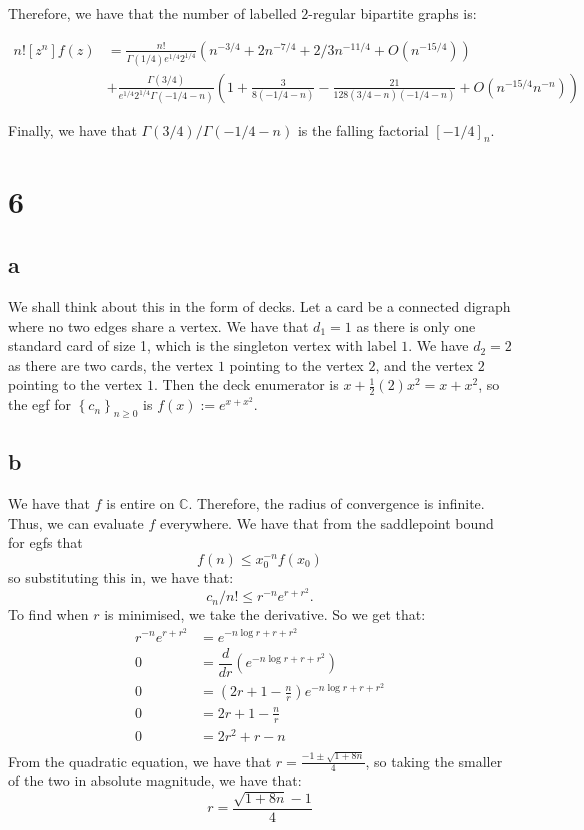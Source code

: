 \documentclass[]{article}
\begin{document}
Therefore, we have that the number of labelled $2$-regular bipartite graphs is:

\begin{align}
	n! [z^n] f(z)&=
\frac{n!}{\Gamma(1/4) e^{1/4} 2^{1/4}}\left( n^{-3/4} +  2 n^{-7/4} + 2/3 n^{-11/4} + O(n^{-15/4}) \right)\\ 
&+
\frac{\Gamma(3/4)}{e^{1/4} 2^{1/4} \Gamma(-1/4 - n)}  \left(1+ \frac{3}{8 (-1/4 - n)} - \frac{21}{128 (3/4 - n)(-1/4 - n)}+  O(n^{-15/4} n^{-n})\right)
\end{align}

Finally, we have that $\Gamma(3/4)/  \Gamma(-1/4 - n)$ is the falling factorial $[-1/4]_n$. 

\section{6}
\subsection{a}
We shall think about this in the form of decks. Let a card be a connected digraph where no two edges share a vertex. We have that $d_1 = 1$ as there is only one standard card of size 1, which is the singleton vertex with label $1$. We have $d_2 = 2$ as there are two cards, the vertex $1$ pointing to the vertex $2$, and the vertex $2$ pointing to the vertex $1$. Then the deck enumerator is $x + \frac{1}{2} (2) x^2 = x + x^2$, so the egf for $\left\{ c_n\right\}_{n \geq 0}$ is $f(x) := e^{x + x^2}$.

\subsection{b}
We have that $f$ is entire on $\mathbb{C}$. Therefore, the radius of convergence is infinite. Thus, we can evaluate $f$ everywhere. We have that from the saddlepoint bound for egfs that
\begin{equation}
	[x^n] f(n) \leq x_0^{-n} f(x_0)
\end{equation}
so substituting this in, we have that:
\begin{equation}
	c_n/n! \leq r^{-n} e^{r + r^2}.
\end{equation}
To find when $r$ is minimised, we take the derivative. So we get that:
\begin{align*}
	 r^{-n} e^{r + r^2} &= e^{-n \log r + r + r^2}\\
	 0 &= \dfrac{d}{dr}(e^{-n \log r + r + r^2}) \\
	 0 &= \left(2r + 1 - \frac{n}{r}\right) e^{-n \log r + r + r^2}\\
	 0 &= 2r + 1 - \frac{n}{r}\\
	 0 &= 2r^2 + r - n\\
\end{align*}
From the quadratic equation, we have that $r = \frac{-1 \pm \sqrt{1 + 8n}}{4}$, so taking the smaller of the two in absolute magnitude, we have that:
\begin{equation}
	r = \frac{\sqrt{1 + 8n} - 1}{4}
\end{equation}
\end{document}
